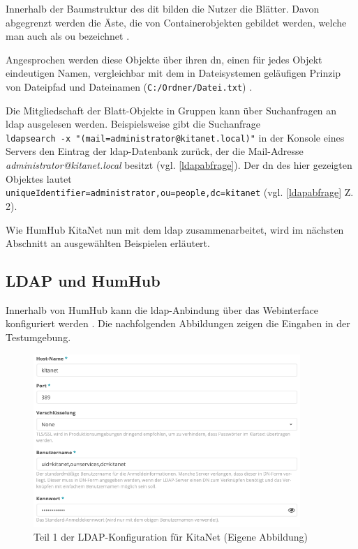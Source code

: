 Innerhalb der Baumstruktur des \ac{dit} bilden die Nutzer die Blätter. Davon abgegrenzt werden die Äste, die von Containerobjekten gebildet werden, welche man auch als \ac{ou} bezeichnet \citep[vgl.][614]{Deimeke2019}.

Angesprochen werden diese Objekte über ihren \ac{dn}, einen für jedes Objekt eindeutigen Namen, vergleichbar mit dem in Dateisystemen geläufigen Prinzip von Dateipfad und Dateinamen (\zb \verb+C:/Ordner/Datei.txt+) \citep[vgl.][613]{Deimeke2019}. 

Die Mitgliedschaft der Blatt-Objekte in Gruppen kann über Suchanfragen an \ac{ldap} ausgelesen werden. Beispielsweise gibt die Suchanfrage\\ \verb+ldapsearch -x "(mail=administrator@kitanet.local)"+ in der Konsole eines Servers den Eintrag der \ac{ldap}-Datenbank zurück, der die Mail-Adresse \textit{administrator@kitanet.local} besitzt (vgl. \autoref{ldapabfrage}). Der \ac{dn} des hier gezeigten Objektes lautet \\ \verb+uniqueIdentifier=administrator,ou=people,dc=kitanet+ (vgl. \autoref{ldapabfrage} Z. 2).

Wie HumHub \bzw KitaNet nun mit dem \ac{ldap} zusammenarbeitet, wird im nächsten Abschnitt an ausgewählten Beispielen erläutert.

\subsection{LDAP und HumHub}

Innerhalb von HumHub kann die \ac{ldap}-Anbindung über das Webinterface konfiguriert werden \citep[vgl.][]{humldap}. Die nachfolgenden Abbildungen zeigen die Eingaben in der Testumgebung. 

\begin{figure}[H]
  \centering
  \includegraphics[width=0.9\textwidth]{res/ldapkitanet1.png}
  \caption{Teil 1 der LDAP-Konfiguration für KitaNet (Eigene Abbildung)}
  \label{fig:LDAP KitaNet Teil 1}
\end{figure}

